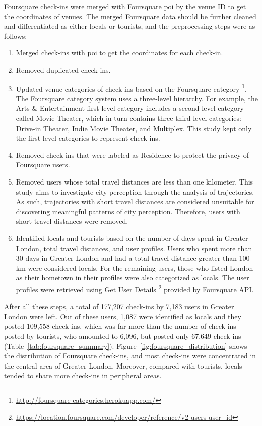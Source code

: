 \documentclass{article}
\theoremstyle{definition}
\theoremstyle{remark}
\begin{document}
Foursquare check-ins were merged with Foursquare \acrshort{poi} by the venue ID to get the coordinates of venues. The merged Foursquare data should be further cleaned and differentiated as either locals or tourists, and the preprocessing steps were as follows:
\begin{enumerate}
    \item Merged check-ins with \acrshort{poi} to get the coordinates for each check-in.
    \item Removed duplicated check-ins.
    \item Updated venue categories of check-ins based on the Foursquare category \footnote{\url{http://foursquare-categories.herokuapp.com/}}. The Foursquare category system uses a three-level hierarchy. For example, the Arts \& Entertainment first-level category includes a second-level category called Movie Theater, which in turn contains three third-level categories: Drive-in Theater, Indie Movie Theater, and Multiplex. This study kept only the first-level categories to represent 
    check-ins.
    \item Removed check-ins that were labeled as Residence to protect the privacy of Foursquare users.
    \item Removed users whose total travel distances are less than one kilometer. This study aims to investigate city perception through the analysis of trajectories. As such, trajectories with short travel distances are considered unsuitable for discovering meaningful patterns of city perception. Therefore, users with short travel distances were removed.
    \item Identified locals and tourists based on the number of days spent in Greater London, total travel distances, and user profiles. Users who spent more than 30 days in Greater London and had a total travel distance greater than 100 km were considered locals. For the remaining users, those who listed London as their hometown in their profiles were also categorized as locals. The user profiles were retrieved using Get User Details \footnote{\url{https://location.foursquare.com/developer/reference/v2-users-user_id}} provided by Foursquare API.
\end{enumerate}

After all these steps, a total of 177,207 check-ins by 7,183 users in Greater London were left. Out of these users, 1,087 were identified as locals and they posted 109,558 check-ins, which was far more than the number of check-ins posted by tourists, who amounted to 6,096, but posted only 67,649 check-ins (Table~\ref{tab:foursquare_summary}). Figure~\ref{fig:foursquare_distribution} shows the distribution of Foursquare check-ins, and most check-ins were concentrated in the central area of Greater London. Moreover, compared with tourists, locals tended to share more check-ins in peripheral areas.
\end{document}
